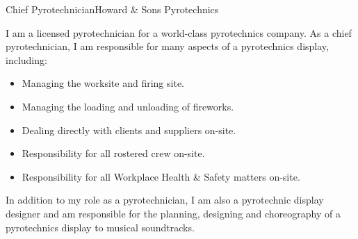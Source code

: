 \begin{professionalExperience}
{Chief Pyrotechnician}{Howard \& Sons Pyrotechnics}
{I am a licensed pyrotechnician for a world-class pyrotechnics company. As a
chief pyrotechnician, I am responsible for many aspects of a pyrotechnics
display, including:
\begin{itemize}
    \item Managing the worksite and firing site.
    \item Managing the loading and unloading of fireworks.
    \item Dealing directly with clients and suppliers on-site.
    \item Responsibility for all rostered crew on-site.
    \item Responsibility for all Workplace Health \& Safety matters on-site.
\end{itemize}

In addition to my role as a pyrotechnician, I am also a pyrotechnic display
designer and am responsible for the planning, designing and choreography of a
pyrotechnics display to musical soundtracks.}

\end{professionalExperience}
